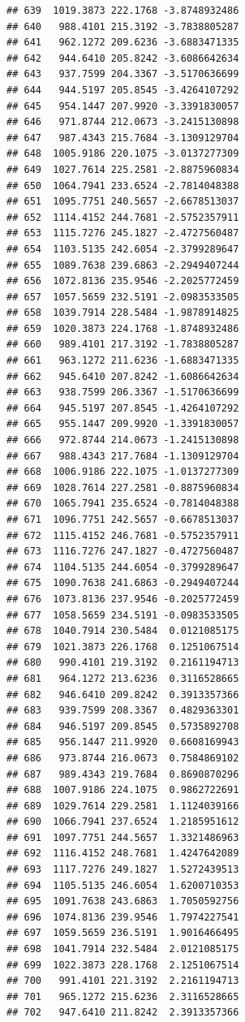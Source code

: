 \documentclass[
]{article}
\begin{document}
\begin{verbatim}
## 639  1019.3873 222.1768 -3.8748932486
## 640   988.4101 215.3192 -3.7838805287
## 641   962.1272 209.6236 -3.6883471335
## 642   944.6410 205.8242 -3.6086642634
## 643   937.7599 204.3367 -3.5170636699
## 644   944.5197 205.8545 -3.4264107292
## 645   954.1447 207.9920 -3.3391830057
## 646   971.8744 212.0673 -3.2415130898
## 647   987.4343 215.7684 -3.1309129704
## 648  1005.9186 220.1075 -3.0137277309
## 649  1027.7614 225.2581 -2.8875960834
## 650  1064.7941 233.6524 -2.7814048388
## 651  1095.7751 240.5657 -2.6678513037
## 652  1114.4152 244.7681 -2.5752357911
## 653  1115.7276 245.1827 -2.4727560487
## 654  1103.5135 242.6054 -2.3799289647
## 655  1089.7638 239.6863 -2.2949407244
## 656  1072.8136 235.9546 -2.2025772459
## 657  1057.5659 232.5191 -2.0983533505
## 658  1039.7914 228.5484 -1.9878914825
## 659  1020.3873 224.1768 -1.8748932486
## 660   989.4101 217.3192 -1.7838805287
## 661   963.1272 211.6236 -1.6883471335
## 662   945.6410 207.8242 -1.6086642634
## 663   938.7599 206.3367 -1.5170636699
## 664   945.5197 207.8545 -1.4264107292
## 665   955.1447 209.9920 -1.3391830057
## 666   972.8744 214.0673 -1.2415130898
## 667   988.4343 217.7684 -1.1309129704
## 668  1006.9186 222.1075 -1.0137277309
## 669  1028.7614 227.2581 -0.8875960834
## 670  1065.7941 235.6524 -0.7814048388
## 671  1096.7751 242.5657 -0.6678513037
## 672  1115.4152 246.7681 -0.5752357911
## 673  1116.7276 247.1827 -0.4727560487
## 674  1104.5135 244.6054 -0.3799289647
## 675  1090.7638 241.6863 -0.2949407244
## 676  1073.8136 237.9546 -0.2025772459
## 677  1058.5659 234.5191 -0.0983533505
## 678  1040.7914 230.5484  0.0121085175
## 679  1021.3873 226.1768  0.1251067514
## 680   990.4101 219.3192  0.2161194713
## 681   964.1272 213.6236  0.3116528665
## 682   946.6410 209.8242  0.3913357366
## 683   939.7599 208.3367  0.4829363301
## 684   946.5197 209.8545  0.5735892708
## 685   956.1447 211.9920  0.6608169943
## 686   973.8744 216.0673  0.7584869102
## 687   989.4343 219.7684  0.8690870296
## 688  1007.9186 224.1075  0.9862722691
## 689  1029.7614 229.2581  1.1124039166
## 690  1066.7941 237.6524  1.2185951612
## 691  1097.7751 244.5657  1.3321486963
## 692  1116.4152 248.7681  1.4247642089
## 693  1117.7276 249.1827  1.5272439513
## 694  1105.5135 246.6054  1.6200710353
## 695  1091.7638 243.6863  1.7050592756
## 696  1074.8136 239.9546  1.7974227541
## 697  1059.5659 236.5191  1.9016466495
## 698  1041.7914 232.5484  2.0121085175
## 699  1022.3873 228.1768  2.1251067514
## 700   991.4101 221.3192  2.2161194713
## 701   965.1272 215.6236  2.3116528665
## 702   947.6410 211.8242  2.3913357366

\end{verbatim}
\end{document}
